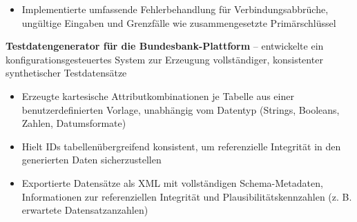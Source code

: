 \documentclass[11pt,a4paper,sans]{moderncv}
\begin{document}
\begin{itemize}
{{\begin{itemize}
    \item Implementierte umfassende Fehlerbehandlung für Verbindungsabbrüche, ungültige Eingaben und Grenzfälle wie zusammengesetzte Primärschlüssel
\end{itemize}
\vspace{3pt}
\textbf{Testdatengenerator für die Bundesbank-Plattform} -- entwickelte ein konfigurationsgesteuertes System zur Erzeugung vollständiger, konsistenter synthetischer Testdatensätze
\begin{itemize}
    \item Erzeugte kartesische Attributkombinationen je Tabelle aus einer benutzerdefinierten Vorlage, unabhängig vom Datentyp (Strings, Booleans, Zahlen, Datumsformate)
    \item Hielt IDs tabellenübergreifend konsistent, um referenzielle Integrität in den generierten Daten sicherzustellen
    \item Exportierte Datensätze als XML mit vollständigen Schema-Metadaten, Informationen zur referenziellen Integrität und Plausibilitätskennzahlen (z. B. erwartete Datensatzanzahlen)
\end{itemize}}}

\end{itemize}

\end{document}
